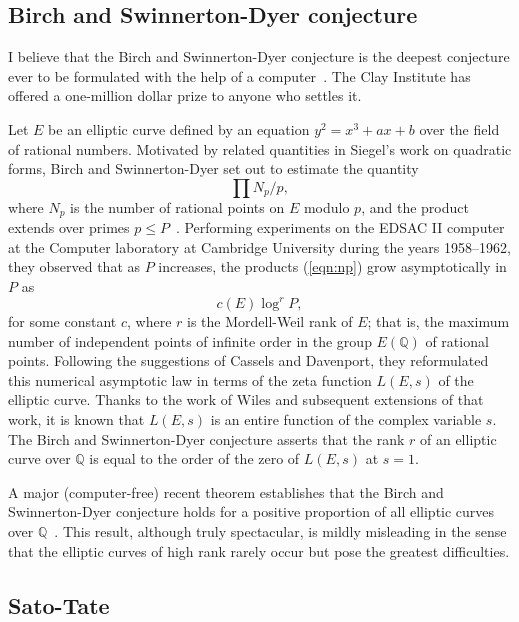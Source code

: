 \documentclass{llncs}
\newcommand{\ring}[1]{\mathbb{#1}}
\begin{document}
\subsection{Birch and Swinnerton-Dyer conjecture}

I believe that the Birch and Swinnerton-Dyer conjecture is the deepest
conjecture ever to be formulated with the help of a computer~\cite{BSD}.  The
Clay Institute has offered a one-million dollar prize to anyone who
settles it.

Let $E$ be an elliptic curve defined by an equation $y^2 = x^3 + a x +
b$ over the field of rational numbers.  Motivated by related
quantities in Siegel's work on quadratic forms, Birch and
Swinnerton-Dyer set out to estimate the quantity
\begin{equation}\label{eqn:np}
\prod {N_p/p},
\end{equation}
where $N_p$ is the number of rational points on $E$ modulo $p$, and
the product extends over primes $p\le P$~\cite{Bir}.  Performing
experiments on the EDSAC II computer at the Computer laboratory at
Cambridge University during the years 1958--1962, they observed that
as $P$ increases, the products (\ref{eqn:np}) grow asymptotically in
$P$ as
\[
c(E) \log^r P,
\]
for some constant $c$, where $r$ is the Mordell-Weil rank of $E$; that
is, the maximum number of independent points of infinite order in the
group $E(\ring{Q})$ of rational points.  Following the suggestions of
Cassels and Davenport, they reformulated this numerical asymptotic law
in terms of the zeta function $L(E,s)$ of the elliptic curve.  Thanks
to the work of Wiles and subsequent extensions of that work, it is
known that $L(E,s)$ is an entire function of the complex variable $s$.
The Birch and Swinnerton-Dyer conjecture asserts that the rank $r$ of
an elliptic curve over $\ring{Q}$ is equal to the order of the zero of
$L(E,s)$ at $s=1$.

A major (computer-free) recent theorem establishes that the Birch and
Swinnerton-Dyer conjecture holds for a positive proportion of all
elliptic curves over $\ring{Q}$~\cite{BS:2010}.  This result, although
truly spectacular, is mildly misleading in the sense that the elliptic
curves of high rank rarely occur but pose the greatest difficulties.





\subsection{Sato-Tate}
\end{document}
